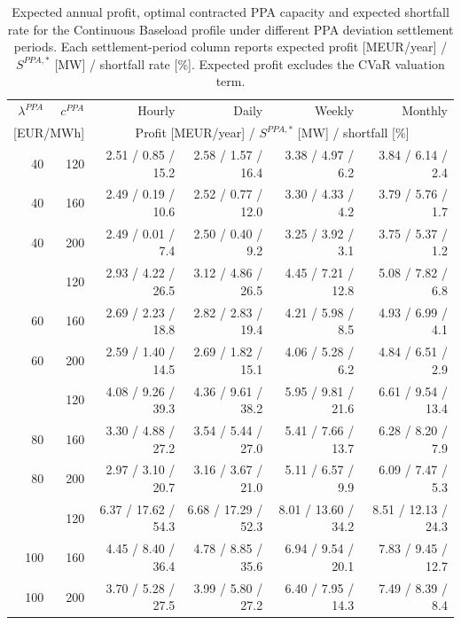 \begin{table}[htbp]
\centering
\scriptsize
\setlength{\tabcolsep}{2.5pt}
\caption{Expected annual profit, optimal contracted PPA capacity and expected shortfall rate for the Continuous Baseload profile under different PPA deviation settlement periods. Each settlement-period column reports expected profit [MEUR/year] / $S^{PPA,*}$ [MW] / shortfall rate [\%]. Expected profit excludes the CVaR valuation term.}
\label{tab:settlement_period_continuous_baseload}
\begin{tabular*}{\textwidth}{@{\extracolsep{\fill}}rrrrrr@{}}
\toprule
$\lambda^{PPA}$ & $c^{PPA}$ & Hourly & Daily & Weekly & Monthly \\
\multicolumn{2}{c}{[EUR/MWh]} & \multicolumn{4}{c}{Profit [MEUR/year] / $S^{PPA,*}$ [MW] / shortfall [\%]} \\
\midrule
40 & 120 & 2.51 / 0.85 / 15.2 & 2.58 / 1.57 / 16.4 & 3.38 / 4.97 / 6.2 & 3.84 / 6.14 / 2.4 \\
40 & 160 & 2.49 / 0.19 / 10.6 & 2.52 / 0.77 / 12.0 & 3.30 / 4.33 / 4.2 & 3.79 / 5.76 / 1.7 \\
40 & 200 & 2.49 / 0.01 / 7.4 & 2.50 / 0.40 / 9.2 & 3.25 / 3.92 / 3.1 & 3.75 / 5.37 / 1.2 \\
\addlinespace
60 & 120 & 2.93 / 4.22 / 26.5 & 3.12 / 4.86 / 26.5 & 4.45 / 7.21 / 12.8 & 5.08 / 7.82 / 6.8 \\
60 & 160 & 2.69 / 2.23 / 18.8 & 2.82 / 2.83 / 19.4 & 4.21 / 5.98 / 8.5 & 4.93 / 6.99 / 4.1 \\
60 & 200 & 2.59 / 1.40 / 14.5 & 2.69 / 1.82 / 15.1 & 4.06 / 5.28 / 6.2 & 4.84 / 6.51 / 2.9 \\
\addlinespace
80 & 120 & 4.08 / 9.26 / 39.3 & 4.36 / 9.61 / 38.2 & 5.95 / 9.81 / 21.6 & 6.61 / 9.54 / 13.4 \\
80 & 160 & 3.30 / 4.88 / 27.2 & 3.54 / 5.44 / 27.0 & 5.41 / 7.66 / 13.7 & 6.28 / 8.20 / 7.9 \\
80 & 200 & 2.97 / 3.10 / 20.7 & 3.16 / 3.67 / 21.0 & 5.11 / 6.57 / 9.9 & 6.09 / 7.47 / 5.3 \\
\addlinespace
100 & 120 & 6.37 / 17.62 / 54.3 & 6.68 / 17.29 / 52.3 & 8.01 / 13.60 / 34.2 & 8.51 / 12.13 / 24.3 \\
100 & 160 & 4.45 / 8.40 / 36.4 & 4.78 / 8.85 / 35.6 & 6.94 / 9.54 / 20.1 & 7.83 / 9.45 / 12.7 \\
100 & 200 & 3.70 / 5.28 / 27.5 & 3.99 / 5.80 / 27.2 & 6.40 / 7.95 / 14.3 & 7.49 / 8.39 / 8.4 \\
\bottomrule
\end{tabular*}
\end{table}
